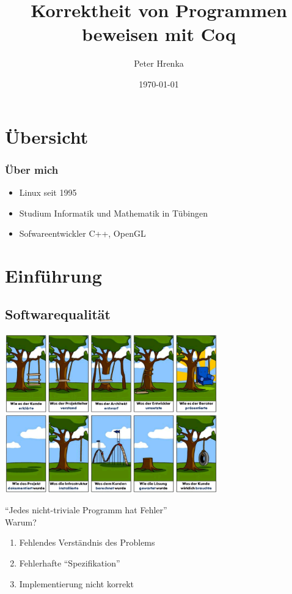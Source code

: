 \documentclass[aspectratio=169]{beamer}
\title{Korrektheit von Programmen beweisen mit Coq}
\institute{Linux Tag Tübingen 2016}
\author{Peter Hrenka}
\date{\today}
\begin{document}
\begin{frame}
\titlepage
\end{frame}
\section*{Übersicht}
\begin{frame}
  \tableofcontents
\end{frame}
\begin{frame}
  \frametitle{Über mich}
  \begin{itemize}
    \item Linux seit 1995
    \item Studium Informatik und Mathematik in Tübingen
    \item Sofwareentwickler C++, OpenGL
  \end{itemize}
\end{frame}
\section{Einführung}
\subsection{Softwarequalität}
\begin{frame}
  \begin{center}
    \includegraphics[width=9.2cm]{projekt-schaukel-baum.png}
  \end{center}
\end{frame}
\begin{frame}
  ``Jedes nicht-triviale Programm hat Fehler''\\
  \pause
  \vfill
  Warum?
  \pause
  \vfill
  \begin{enumerate}
    \item Fehlendes Verständnis des Problems
    \pause
    \item Fehlerhafte ``Spezifikation''
    \pause
    \item Implementierung nicht korrekt
  \end{enumerate}
\end{frame}
\end{document}
